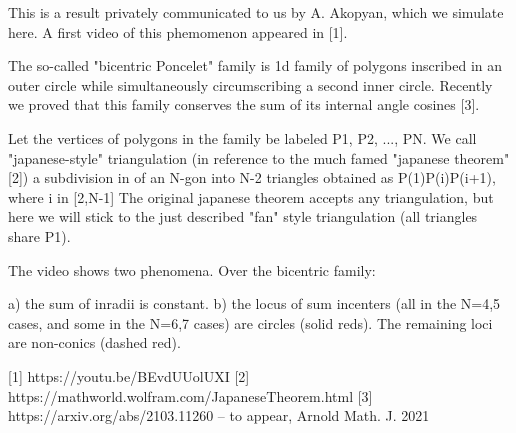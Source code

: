 This is a result privately communicated to us by A. Akopyan, which we simulate here. A first video of this phemomenon appeared in [1].

The so-called "bicentric Poncelet" family is 1d family of polygons inscribed in an outer circle while simultaneously circumscribing a second inner circle. Recently we proved that  this family conserves the sum of its internal angle cosines [3].

Let the vertices of polygons in the family be labeled P1, P2, ..., PN. We call "japanese-style" triangulation (in reference to the much famed "japanese theorem" [2]) a subdivision in of an N-gon into N-2 triangles obtained as P(1)P(i)P(i+1), where i in [2,N-1] The original japanese theorem accepts any triangulation, but here we will stick to the just described "fan" style triangulation (all triangles share P1).

The video shows two phenomena. Over the bicentric family:

a) the sum of inradii is constant.
b) the locus of sum incenters (all in the N=4,5 cases, and some in the N=6,7 cases) are circles (solid reds). The remaining loci are non-conics (dashed red).

[1] https://youtu.be/BEvdUUolUXI
[2] https://mathworld.wolfram.com/JapaneseTheorem.html
[3] https://arxiv.org/abs/2103.11260 -- to appear, Arnold Math. J. 2021